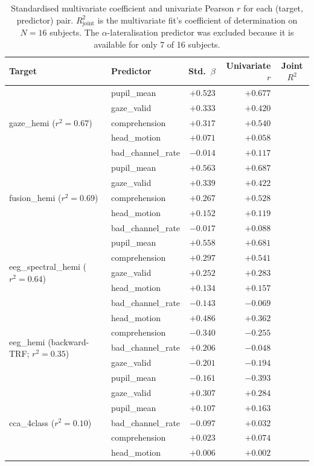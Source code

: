 \begin{table}[ht]
\centering
\begin{tabular}{llrrc}
\toprule
Target & Predictor & Std.\ $\beta$ & Univariate $r$ & Joint $R^2$ \\
\midrule
\multirow{5}{*}{gaze\_hemi ($r^2=0.67$)}
& pupil\_mean        & $+0.523$ & $+0.677$ & \\
& gaze\_valid        & $+0.333$ & $+0.420$ & \\
& comprehension      & $+0.317$ & $+0.540$ & \\
& head\_motion       & $+0.071$ & $+0.058$ & \\
& bad\_channel\_rate & $-0.014$ & $+0.117$ & \\
\midrule
\multirow{5}{*}{fusion\_hemi ($r^2=0.69$)}
& pupil\_mean        & $+0.563$ & $+0.687$ & \\
& gaze\_valid        & $+0.339$ & $+0.422$ & \\
& comprehension      & $+0.267$ & $+0.528$ & \\
& head\_motion       & $+0.152$ & $+0.119$ & \\
& bad\_channel\_rate & $-0.017$ & $+0.088$ & \\
\midrule
\multirow{5}{*}{eeg\_spectral\_hemi ($r^2=0.64$)}
& pupil\_mean        & $+0.558$ & $+0.681$ & \\
& comprehension      & $+0.297$ & $+0.541$ & \\
& gaze\_valid        & $+0.252$ & $+0.283$ & \\
& head\_motion       & $+0.134$ & $+0.157$ & \\
& bad\_channel\_rate & $-0.143$ & $-0.069$ & \\
\midrule
\multirow{5}{*}{eeg\_hemi (backward-TRF; $r^2=0.35$)}
& head\_motion       & $+0.486$ & $+0.362$ & \\
& comprehension      & $-0.340$ & $-0.255$ & \\
& bad\_channel\_rate & $+0.206$ & $-0.048$ & \\
& gaze\_valid        & $-0.201$ & $-0.194$ & \\
& pupil\_mean        & $-0.161$ & $-0.393$ & \\
\midrule
\multirow{5}{*}{cca\_4class ($r^2=0.10$)}
& gaze\_valid        & $+0.307$ & $+0.284$ & \\
& pupil\_mean        & $+0.107$ & $+0.163$ & \\
& bad\_channel\_rate & $-0.097$ & $+0.032$ & \\
& comprehension      & $+0.023$ & $+0.074$ & \\
& head\_motion       & $+0.006$ & $+0.002$ & \\
\bottomrule
\end{tabular}
\caption{Standardised multivariate coefficient and univariate Pearson
$r$ for each (target, predictor) pair. $R^2_{\text{joint}}$ is the
multivariate fit's coefficient of determination on $N=16$ subjects.
The $\alpha$-lateralisation predictor was excluded because it is
available for only 7 of 16 subjects.}
\end{table}

